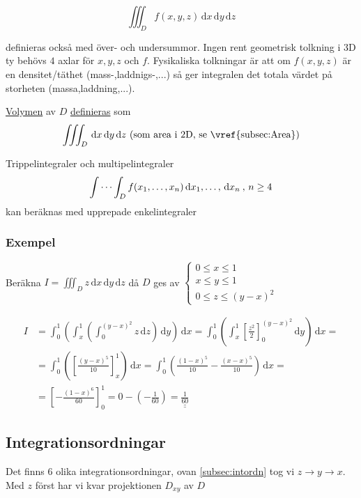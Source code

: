 \documentclass[a4paper]{article}
\newcommand{\svar}[1]{\underline{\underline{#1}}}
\begin{document}
$$\iiint_D f(x,y,z) \,\mathrm{d}x\,\mathrm{d}y\,\mathrm{d}z$$

definieras också med över- och undersummor. Ingen rent geometrisk tolkning i 3D ty behövs $4$ axlar för $x,y,z$ och $f$. 
Fysikaliska tolkningar är att om $f(x,y,z)$ är en densitet/täthet (mass-,laddnigs-,...) så ger integralen det totala värdet på storheten (massa,laddning,...). \newline

\underline{Volymen} av $D$ \underline{definieras} som
$$\iiint_D \,\mathrm{d}x\,\mathrm{d}y\,\mathrm{d}z \text{  (som area i 2D, se \vref{subsec:Area})}$$

Trippelintegraler och multipelintegraler
$$\idotsint_D f(x_1,\ldots,x_n) \,\mathrm{d}x_1,\ldots,\,\mathrm{d}x_n \: ,\, n \geq 4$$
kan beräknas med upprepade enkelintegraler

\subsubsection{Exempel} \label{subsec:intordn}

Beräkna $I = \iiint_D z \,\mathrm{d}x\,\mathrm{d}y\,\mathrm{d}z$ då $D$ ges av 
$\begin{cases}
	0 \leq x \leq 1 \\
	x \leq y \leq 1 \\
	0 \leq z \leq (y-x)^2
\end{cases}$

\begin{align*}
	I &= \int_0^1 \left(\int_x^1 \left( \int_0^{(y-x)^2} z\,\mathrm{d}z\right)\,\mathrm{d}y\right)\,\mathrm{d}x = 
	\int_0^1 \left(\int_x^1 \left[ \frac{z^2}{2} \right]_0^{(y-x)^2}\,\mathrm{d}y\right)\,\mathrm{d}x = \\
	&= \int_0^1 \left(\left[\frac{(y-x)^5}{10}\right]_x^1\right)\,\mathrm{d}x = 
	\int_0^1 \left(\frac{(1-x)^5}{10} - \frac{(x-x)^5}{10}\right)\,\mathrm{d}x = \\
	&= \left[-\frac{(1-x)^6}{60}\right]_0^1 =
	0 - \left(-\frac{1}{60}\right) =
	\svar{\frac{1}{60}}
\end{align*}

\newpage
\subsection{Integrationsordningar}
Det finns $6$ olika integrationsordningar, ovan \vref{subsec:intordn} tog vi $z\rightarrow y\rightarrow x$. Med $z$ först har vi kvar projektionen $D_{xy}$ av $D$
\end{document}
